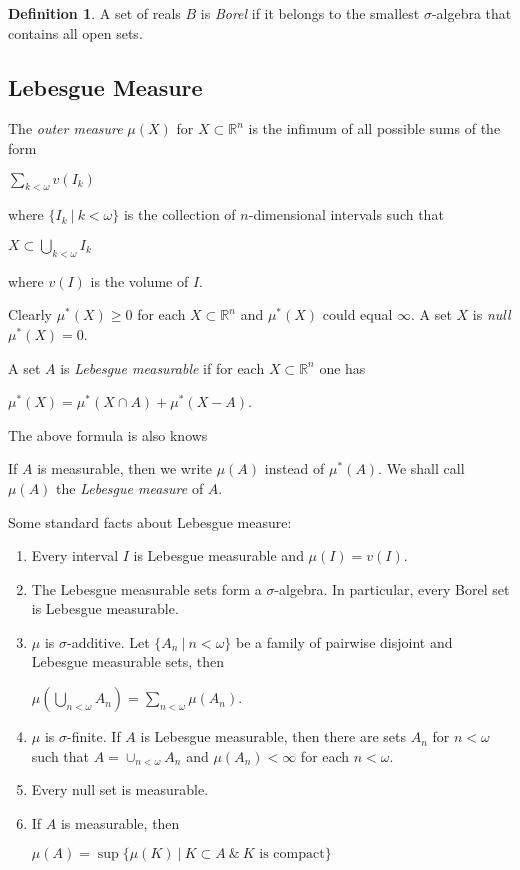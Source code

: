\documentclass[8pt]{article}
\theoremstyle{definition}
\newtheorem{definition}{Definition}[section]
\theoremstyle{definition}
\theoremstyle{definition}
\theoremstyle{definition}
\theoremstyle{definition}
\theoremstyle{definition}
\theoremstyle{definition}
\theoremstyle{definition}
\theoremstyle{definition}
\theoremstyle{definition}
\theoremstyle{definition}
\theoremstyle{definition}
\theoremstyle{definition}
\theoremstyle{definition}
\theoremstyle{question}
\begin{document}
\begin{definition}
  A set of reals $B$ is \emph{Borel} if it belongs to the smallest $\sigma$-algebra that contains all open sets.
\end{definition}

\subsection{Lebesgue Measure}

The \emph{outer measure} $\mu(X)$ for $X \subset \mathbb{R}^n$ is the infimum of all possible sums of
the form
\begin{center}
  $\sum \limits_{k < \omega} v(I_k)$
\end{center}
where $\{ I_k \: | \: k < \omega \}$ is the collection of $n$-dimensional intervals such that
\begin{center}
  $X \subset \bigcup \limits_{k < \omega} I_k$
\end{center}
where $v(I)$ is the volume of $I$.

Clearly $\mu^*(X) \geq 0$ for each $X \subset \mathbb{R}^n$ and $\mu^*(X)$ could equal $\infty$. A set $X$ is \emph{null}
$\mu^*(X) = 0$.

A set $A$ is \emph{Lebesgue measurable} if for each $X \subset \mathbb{R}^n$ one has
\begin{center}
  $\mu^*(X) = \mu^*(X \cap A) + \mu^*(X - A)$.
\end{center}
The above formula is also knows

If $A$ is measurable, then we write $\mu(A)$ instead of $\mu^*(A)$. We shall call $\mu(A)$ the \emph{Lebesgue measure} of $A$.

Some standard facts about Lebesgue measure:
\begin{enumerate}
  \item Every interval $I$ is Lebesgue measurable and $\mu(I) = v(I)$.
  \item The Lebesgue measurable sets form a $\sigma$-algebra. In particular, every Borel set is Lebesgue measurable.
  \item $\mu$ is $\sigma$-additive. Let $\{ A_n \: | \: n < \omega \}$ be a family of pairwise disjoint and Lebesgue measurable sets, 
  then
  \begin{center}
    $\mu(\bigcup \limits_{n < \omega} A_n) = \sum \limits_{n < \omega} \mu(A_n)$.
  \end{center}
  \item $\mu$ is $\sigma$-finite. If $A$ is Lebesgue measurable, then there are sets $A_n$ for $n < \omega$
  such that $A = \cup_{n < \omega} A_n$ and $\mu(A_n) < \infty$ for each $n < \omega$.
  \item Every null set is measurable.
  \item If $A$ is measurable, then
  \begin{center}
    $\mu(A) = \sup \{ \mu(K) \: | \: K \subset A \: \& \: \text{$K$ is compact}\}$
  \end{center}
\end{enumerate}
\end{document}
